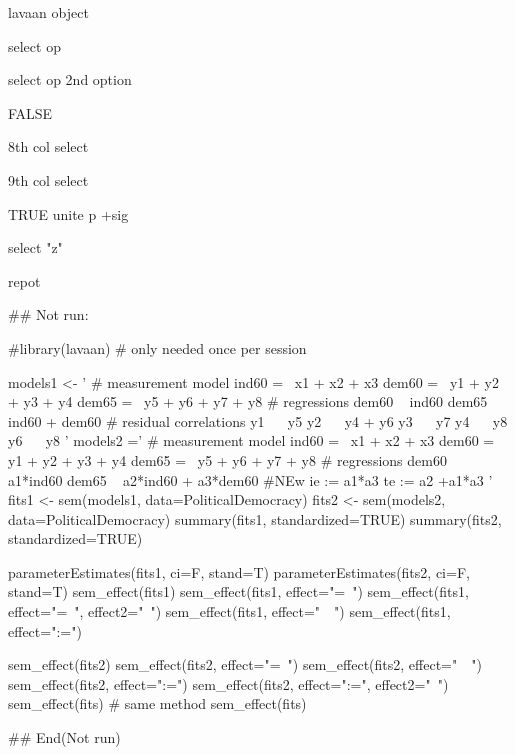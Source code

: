 \documentclass[a4paper]{book}
\begin{document}
%
\begin{Arguments}
\begin{ldescription}
\item[\code{model\_sem}] lavaan object

\item[\code{effect}] select op

\item[\code{effect2}] select op 2nd option

\item[\code{ci}] FALSE

\item[\code{lower}] 8th col select

\item[\code{upper}] 9th col select

\item[\code{unite}] TRUE unite p +sig

\item[\code{unite\_col}] select "z"
\end{ldescription}
\end{Arguments}
%
\begin{Value}
repot
\end{Value}
%
\begin{Examples}
\begin{ExampleCode}
\#\# Not run: 

 #library(lavaan) # only needed once per session

models1 <- '
  # measurement model
    ind60 =~ x1 + x2 + x3
    dem60 =~ y1 + y2 + y3 + y4
    dem65 =~ y5 + y6 + y7 + y8
    # regressions
    dem60 ~ ind60
    dem65 ~ ind60 + dem60
      # residual correlations
    y1 ~~ y5
    y2 ~~ y4 + y6
    y3 ~~ y7
    y4 ~~ y8
    y6 ~~ y8
'
models2 ='
  # measurement model
    ind60 =~ x1 + x2 + x3
    dem60 =~ y1 + y2 + y3 + y4
    dem65 =~ y5 + y6 + y7 + y8
     # regressions
    dem60 ~ a1*ind60
    dem65 ~ a2*ind60 + a3*dem60
 #NEw
   ie := a1*a3
   te := a2 +a1*a3
'
fits1 <- sem(models1, data=PoliticalDemocracy)
fits2 <- sem(models2, data=PoliticalDemocracy)
summary(fits1, standardized=TRUE)
summary(fits2, standardized=TRUE)

parameterEstimates(fits1, ci=F, stand=T)
parameterEstimates(fits2, ci=F, stand=T)
sem_effect(fits1)
sem_effect(fits1, effect="=~")
sem_effect(fits1, effect="=~", effect2="~")
sem_effect(fits1, effect="~~")
sem_effect(fits1, effect=":=")

sem_effect(fits2)
sem_effect(fits2, effect="=~")
sem_effect(fits2, effect="~~")
sem_effect(fits2, effect=":=")
sem_effect(fits2, effect=":=", effect2="~")
 sem_effect(fits)%
 # same method
 sem_effect(fits)%


## End(Not run)


\end{ExampleCode}
\end{Examples}
\end{document}
